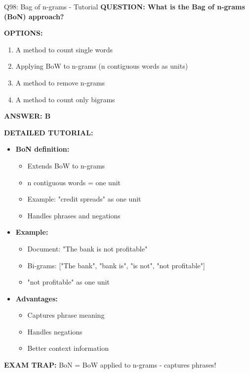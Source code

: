 \documentclass[8pt]{beamer}
\begin{document}
	\begin{frame}{Q98: Bag of n-grams - Tutorial}
		\fontsize{6.5}{7.5}\selectfont
		\textbf{QUESTION: What is the Bag of n-grams (BoN) approach?}
		
		\vspace{0.1cm}
		\textbf{OPTIONS:}
		\begin{enumerate}
			\item A method to count single words
			\item Applying BoW to n-grams (n contiguous words as units)
			\item A method to remove n-grams
			\item A method to count only bigrams
		\end{enumerate}
		
		\vspace{0.1cm}
		\textcolor{myblue}{\textbf{ANSWER: B}}
		
		\vspace{0.1cm}
		\textbf{DETAILED TUTORIAL:}
		\begin{itemize}
			\item \textbf{BoN definition:}
			\begin{itemize}
				\item Extends BoW to n-grams
				\item n contiguous words = one unit
				\item Example: "credit spreads" as one unit
				\item Handles phrases and negations
			\end{itemize}
			\item \textbf{Example:}
			\begin{itemize}
				\item Document: "The bank is not profitable"
				\item Bi-grams: ["The bank", "bank is", "is not", "not profitable"]
				\item "not profitable" as one unit
			\end{itemize}
			\item \textbf{Advantages:}
			\begin{itemize}
				\item Captures phrase meaning
				\item Handles negations
				\item Better context information
			\end{itemize}
		\end{itemize}
		
		\textcolor{myred}{\textbf{EXAM TRAP:}} BoN = \textcolor{myblue}{BoW applied to n-grams} - captures phrases!
	\end{frame}
	
\end{document}
